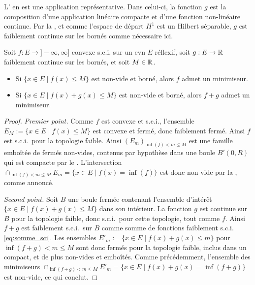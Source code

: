 L' en est une application représentative. Dans celui-ci, la fonction $g$ est la composition d'une application linéaire compacte et d'une fonction non-linéaire continue. 
Par la , et comme l'espace de départ $H^1$ est un Hilbert séparable, $g$ est faiblement continue sur les bornés comme nécessaire ici.

\begin{corollary}
\label{corol:minFctCvxRefl}
%
	Soit $f : E \to ]-\infty,\infty]$ convexe s.c.i. sur un evn $E$ réflexif, soit $g : E \to \mathbb{R}$ faiblement continue sur les bornés, et soit $M \in \mathbb{R}$. %
	\begin{itemize}
		\item Si $\{x\in E\mid f(x) \leq M\}$ est non-vide et borné, alors $f$ admet un minimiseur. 
		\item Si $\{x \in E\mid f(x)+g(x)\leq M\}$ est non-vide et borné, alors $f+g$ admet un minimiseur. 
		\end{itemize}	
\end{corollary}

\begin{proof}
\emph{Premier point.} Comme $f$ est convexe et s.c.i., l'ensemble $E_M := \{x\in E \mid f(x) \leq M\}$ est convexe et fermé, donc faiblement fermé. Ainsi $f$ est s.c.i.\ pour la topologie faible. 
Ainsi $(E_m)_{\inf(f)<m\leq M}$ est une famille emboîtée de fermés non-vides, contenus par hypothèse dans une boule $B'(0,R)$ qui est compacte par le . L'intersection $\cap_{\inf(f) < m\leq M} E_m = \{x \in E \mid f(x) = \inf(f)\}$ est donc non-vide par la , comme annoncé.

\emph{Second point.} 
Soit $B$ une boule fermée contenant l'ensemble d'intérêt $\{x \in E\mid f(x)+g(x)\leq M\}$ dans son intérieur.
La fonction $g$ est continue sur $B$ pour la topologie faible, donc s.c.i.\ pour cette topologie, tout comme $f$. Ainsi $f+g$ est faiblement s.c.i.\ sur $B$ comme somme de fonctions faiblement s.c.i. \eqref{eq:somme_sci}. Les ensembles $E'_m := \{x \in E\mid f(x)+g(x)\leq m\}$ pour $\inf(f+g) < m\leq M$ sont donc fermés pour la topologie faible, inclus dans un compact, et de plus non-vides et emboîtés. Comme précédemment, l'ensemble des minimiseurs $\cap_{\inf(f+g) < m\leq M} E'_m = \{x \in E \mid f(x)+g(x) = \inf(f+g)\}$ est non-vide, ce qui conclut. 
%	
\end{proof}


